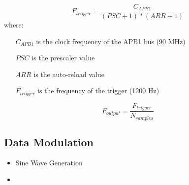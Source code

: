\documentclass{journal}
\begin{document}
\[
  F_{trigger} = \frac{C_{APB1}}{(PSC+1)*(ARR+1)}
\]
where:
\begin{itemize}
  \item[$C_{APB1}$] is the clock frequency of the APB1 bus (90 MHz)
  \item[$PSC$] is the prescaler value
  \item[$ARR$] is the auto-reload value
  \item[$F_{trigger}$] is the frequency of the trigger (1200 Hz)
\end{itemize}

\[
  F_{output} = \frac{F_{trigger}}{N_{samples}}
\]

\subsection{Data Modulation}




\begin{itemize}
  \item Sine Wave Generation
  \item 
\end{itemize}
\end{document}
